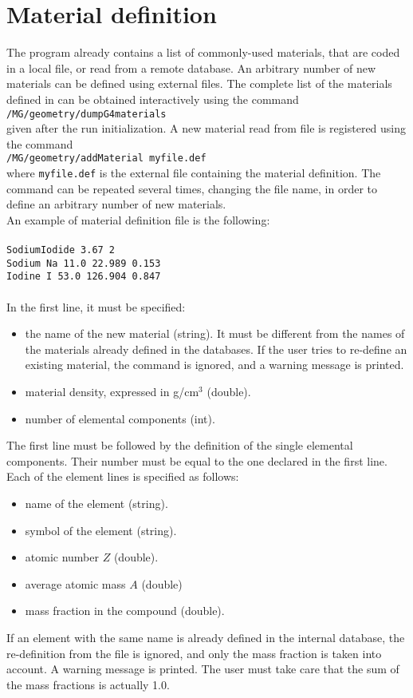 \documentclass[a4paper,12pt,twoside]{article}
\begin{document}
\section{Material definition} \label{material}
The \mage program already contains a list of commonly-used materials, that 
are coded in a local file, or read from a remote database. An arbitrary 
number of new materials can be defined using external files. The complete 
list of the materials defined in \mage can be obtained interactively 
using the command \\
\texttt{/MG/geometry/dumpG4materials} \\
given after the run initialization. 
A new material read from file is registered using the command \\
\texttt{/MG/geometry/addMaterial myfile.def} \\
where \texttt{myfile.def} is the external file containing the material 
definition. The command can be repeated several times, changing the file name, 
in order to define an arbitrary number of new materials. \\
An example of material definition file is the following: \\
\texttt{\\
SodiumIodide 3.67 2 \\
Sodium Na 11.0 22.989 0.153 \\
Iodine I 53.0 126.904 0.847 \\
\\}
In the first line, it must be specified:
\begin{itemize}
\item the name of the new material (string). It must be different from the 
names of the materials already defined in the \mage databases. If the 
user tries to re-define an existing material, the command is ignored, and 
a warning message is printed. 
\item material density, expressed in g/cm$^{3}$ (double).
\item number of elemental components (int).
\end{itemize}
The first line must be followed by the definition of the single elemental 
components. Their number must be equal to the one declared in the first line.
Each of the element lines is specified as follows:
\begin{itemize}
\item name of the element (string).
\item symbol of the element (string).
\item atomic number $Z$ (double).
\item average atomic mass $A$ (double)
\item mass fraction in the compound (double).
\end{itemize}
If an element with the same name is already defined in the \mage internal 
database, the re-definition from the file is ignored, and only the mass 
fraction is taken into account. A warning message is printed. The user 
must take care that the sum of the mass fractions is actually 1.0.
%
\end{document}
